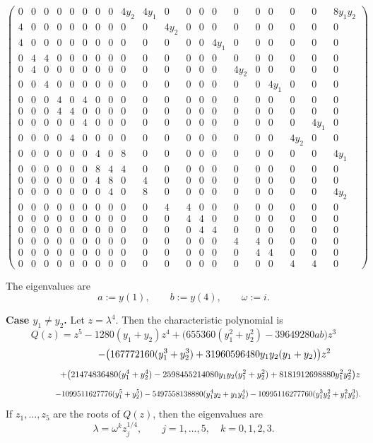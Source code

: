 \documentclass[11pt]{amsart}
\newcounter{num}[section] %
\begin{document}
\begin{enumerate}
\[
\begin{pmatrix}
0&0&0&0&0&0&0&0&4y_2&4y_1&0&0&0&0&0&0&0&0&0&8y_1 y_2\\
4&0&0&0&0&0&0&0&0&0&4y_2&0&0&0&0&0&0&0&0&0\\
4&0&0&0&0&0&0&0&0&0&0&0&0&4y_1&0&0&0&0&0&0\\
0&4&4&0&0&0&0&0&0&0&0&0&0&0&0&0&0&0&0&0\\
0&4&0&0&0&0&0&0&0&0&0&0&0&0&4y_2&0&0&0&0&0\\
0&0&4&0&0&0&0&0&0&0&0&0&0&0&0&0&4y_1&0&0&0\\
0&0&0&4&0&4&0&0&0&0&0&0&0&0&0&0&0&0&0&0\\
0&0&0&4&4&0&0&0&0&0&0&0&0&0&0&0&0&0&0&0\\
0&0&0&0&0&4&0&0&0&0&0&0&0&0&0&0&0&0&4y_1&0\\
0&0&0&0&4&0&0&0&0&0&0&0&0&0&0&0&0&4y_2&0&0\\
0&0&0&0&0&0&4&0&8&0&0&0&0&0&0&0&0&0&0&4y_1\\
0&0&0&0&0&0&8&4&4&0&0&0&0&0&0&0&0&0&0&0\\
0&0&0&0&0&0&4&8&0&4&0&0&0&0&0&0&0&0&0&0\\
0&0&0&0&0&0&0&4&0&8&0&0&0&0&0&0&0&0&0&4y_2\\
0&0&0&0&0&0&0&0&0&0&4&4&0&0&0&0&0&0&0&0\\
0&0&0&0&0&0&0&0&0&0&0&4&4&0&0&0&0&0&0&0\\
0&0&0&0&0&0&0&0&0&0&0&0&4&4&0&0&0&0&0&0\\
0&0&0&0&0&0&0&0&0&0&0&0&0&0&4&4&0&0&0&0\\
0&0&0&0&0&0&0&0&0&0&0&0&0&0&0&4&4&0&0&0\\
0&0&0&0&0&0&0&0&0&0&0&0&0&0&0&0&0&4&4&0
\end{pmatrix}
\]

The eigenvalues are
\[
a:=y(1),\qquad b:=y(4),\qquad \omega:=i.
\]

\noindent\textbf{Case \(y_1\neq y_2\).}
Let \(z=\lambda^4\). Then the characteristic polynomial is
\[
Q(z)=z^5-1280(y_1+y_2)z^4+\bigl(655360(y_1^2+y_2^2)-39649280ab\bigr)z^3
\]
\[
\hspace{2.2cm}
-\bigl(167772160(y_1^3+y_2^3)+31960596480y_1 y_2(y_1+y_2)\bigr)z^2
\]
\[
\hspace{2.2cm}
+\bigl(21474836480(y_1^4+y_2^4)-2598455214080y_1 y_2(y_1^2+y_2^2)+8181912698880y_1^2y_2^2\bigr)z
\]
\[
\hspace{2.2cm}
-1099511627776(y_1^5+y_2^5)-5497558138880(y_1^4 y_2+y_1 y_2^4)-10995116277760(y_1^3 y_2^2 + y_1^2 y_2^3).
\]
If \(z_1,\dots,z_5\) are the roots of \(Q(z)\), then the eigenvalues are
\[
\lambda=\omega^k z_j^{1/4},\qquad j=1,\dots,5,\quad k=0,1,2,3.
\]


\end{enumerate}
\end{document}
